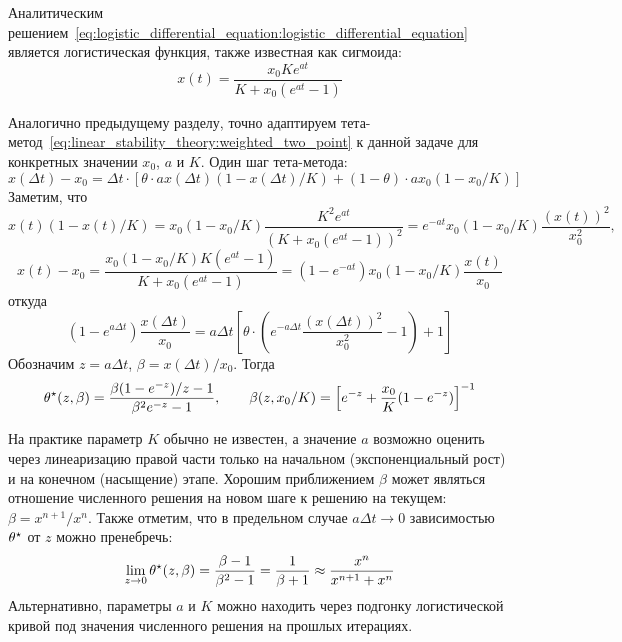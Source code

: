 Аналитическим решением~\eqref{eq:logistic_differential_equation:logistic_differential_equation}
является логистическая функция, также известная как сигмоида:
\begin{equation}
    \label{eq:logistic_differential_equation:logistic_function}
    x(t) = \frac{x_0 K e^{a t}}{K + x_0 (e^{a t} - 1)}
\end{equation}

Аналогично предыдущему разделу, точно адаптируем тета-метод~\eqref{eq:linear_stability_theory:weighted_two_point}
к данной задаче для конкретных значении $ x_0 $, $ a $ и $ K $.
Один шаг тета-метода:
\[
    x(\Delta t) - x_0 = \Delta t \cdot \left[ \theta \cdot a x(\Delta t) (1 - x(\Delta t) / K) + (1 - \theta) \cdot a x_0 (1 - x_0 / K) \right]
\]
Заметим, что
\[
    x(t) (1 - x(t) / K) = x_0 (1 - x_0 / K) \frac{K^2 e^{a t}}{(K + x_0 (e^{a t} - 1))^2} = e^{-a t} x_0 (1 - x_0 / K) \frac{(x(t))^2}{x_0^2},
\]
\[
    x(t) - x_0 = \frac{x_0 (1 - x_0 / K) K (e^{a t} - 1)}{K + x_0 (e^{a t} - 1)} = (1 - e^{- a t}) x_0 (1 - x_0 / K) \frac{x(t)}{x_0}
\]
откуда
\[
    (1 - e^{a \Delta t}) \frac{x(\Delta t)}{x_0} =
    a \Delta t \left[ \theta \cdot \left( e^{- a \Delta t} \frac{(x(\Delta t))^2}{x_0^2}  - 1 \right) + 1 \right]
\]
Обозначим $ z = a \Delta t $, $ \beta = x(\Delta t) / x_0 $.
Тогда
\begin{equation}
    \label{eq:logistic_differential_equation:optimal_theta}
    \theta^\star(z, \beta) = \frac{\beta (1 - e^{-z}) / z - 1}{\beta^2 e^{-z} - 1}, \qquad \beta(z, x_0/K) = \left[ e^{-z} + \frac{x_0}{K} (1 - e^{-z}) \right]^{-1}
\end{equation}

На практике параметр $ K $ обычно не известен,
а значение $ a $ возможно оценить через линеаризацию правой части только
на начальном (экспоненциальный рост) и на конечном (насыщение) этапе.
Хорошим приближением $ \beta $ может являться отношение численного решения на новом шаге
к решению на текущем: $ \beta = x^{n+1} / x^n $.
Также отметим, что в предельном случае $ a \Delta t \to 0 $ зависимостью $ \theta^\star $ от $ z $ можно пренебречь:
\[
    \lim_{z \to 0} \theta^\star(z, \beta) = \frac{\beta - 1}{\beta^2 - 1} = \frac{1}{\beta + 1} \approx \frac{x^n}{x^{n+1} + x^{n}}
\]
Альтернативно, параметры $ a $ и $ K $ можно находить через подгонку логистической кривой
под значения численного решения на прошлых итерациях.



